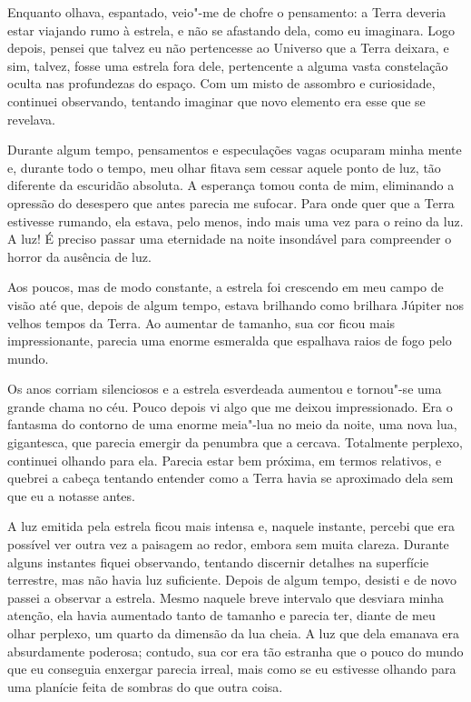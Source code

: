 Enquanto olhava, espantado, veio"-me de chofre o pensamento: a Terra deveria estar viajando rumo à estrela, e não se
afastando dela, como eu imaginara. Logo depois, pensei que talvez eu não pertencesse ao Universo que a Terra deixara,
e sim, talvez, fosse uma estrela fora dele, pertencente a alguma vasta constelação oculta nas profundezas do espaço.
Com um misto de assombro e curiosidade, continuei observando, tentando imaginar que novo elemento era esse que se
revelava.

Durante algum tempo, pensamentos e especulações vagas ocuparam minha mente e, durante todo o tempo, meu olhar fitava sem
cessar aquele ponto de luz, tão diferente da escuridão absoluta. A esperança tomou conta de mim, eliminando a opressão
do desespero que antes parecia me sufocar. Para onde quer que a Terra estivesse rumando, ela estava, pelo menos, indo
mais uma vez para o reino da luz. A luz! É preciso passar uma eternidade na noite insondável para compreender o horror
da ausência de luz.

Aos poucos, mas de modo constante, a estrela foi crescendo em meu campo de visão até que, depois de algum tempo, estava
brilhando como brilhara Júpiter nos velhos tempos da Terra. Ao aumentar de tamanho, sua cor ficou mais impressionante,
parecia uma enorme esmeralda que espalhava raios de fogo pelo mundo.

Os anos corriam silenciosos e a estrela esverdeada aumentou e tornou"-se uma grande chama no céu. Pouco depois
vi algo que me deixou impressionado. Era o fantasma do contorno de uma enorme meia"-lua no meio da noite, uma nova lua,
gigantesca, que parecia emergir da penumbra que a cercava. Totalmente perplexo, continuei olhando para ela. Parecia
estar bem próxima, em termos relativos, e quebrei a cabeça tentando entender como a Terra havia se aproximado dela sem
que eu a notasse antes.

A luz emitida pela estrela ficou mais intensa e, naquele instante, percebi que era possível ver outra vez a paisagem
ao redor, embora sem muita clareza. Durante alguns instantes fiquei observando, tentando discernir detalhes na
superfície terrestre, mas não havia luz suficiente. Depois de algum tempo, desisti e de novo passei a observar a
estrela. Mesmo naquele breve intervalo que desviara minha atenção, ela havia aumentado tanto de tamanho e
parecia ter, diante de meu olhar perplexo, um quarto da dimensão da lua cheia. A luz que dela emanava era absurdamente
poderosa; contudo, sua cor era tão estranha que o pouco do mundo que eu conseguia enxergar parecia irreal, mais como se
eu estivesse olhando para uma planície feita de sombras do que outra coisa.

